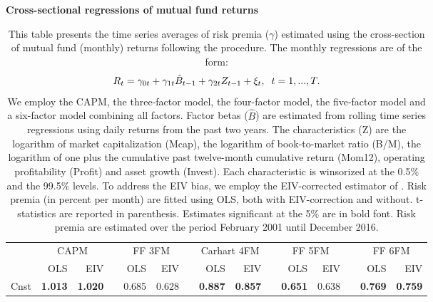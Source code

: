 \begin{singlespacing}
\begin{table}[h!]
\setlength{\tabcolsep}{4.5pt}
\centering
 {\captionsetup{justification=centering,singlelinecheck=off}
\caption{\bfseries Cross-sectional regressions of mutual fund returns }}
\caption*{This table presents the time series averages of risk premia ($\gamma$) estimated using the cross-section of mutual fund (monthly) returns following the \citet{fama1973risk} procedure. The monthly regressions are of the form: 
\begin{equation*}
R_{t} = \gamma_{0t} + \gamma_{1t}\hat{B}_{t-1} + \gamma_{2t}Z_{t-1} + \xi_{t}, \hspace{0.2cm} t=1,...,T.
\end{equation*} We employ the CAPM, the \citet{fama1993common} three-factor model, the \citet{carhart1997persistence} four-factor model, the \citet{FAMA20151} five-factor model and a six-factor model combining all factors. Factor betas ($\hat{B}$) are estimated from rolling time series regressions using daily returns from the past two years. The characteristics (Z) are the logarithm of market capitalization (Mcap), the logarithm of book-to-market ratio (B/M), the logarithm of one plus the cumulative past twelve-month cumulative return (Mom12), operating profitability (Profit) and asset growth (Invest). Each characteristic is winsorized at the 0.5\% and the 99.5\% levels. To address the EIV bias, we employ the EIV-corrected estimator of \citet{chordia2015cross}. Risk premia (in percent per month) are fitted using OLS, both with EIV-correction and without. \citet{fama1973risk} t-statistics are reported in parenthesis. Estimates significant at the 5\% are in bold font. Risk premia are estimated over the period February 2001 until December 2016.}
 \small
\label{my-label}
\begin{tabular}{lrrrrrrrrrrrrrr}
\hline
      & \multicolumn{2}{c}{CAPM}        &           & \multicolumn{2}{c}{FF 3FM}      &           & \multicolumn{2}{c}{Carhart 4FM}  &           & \multicolumn{2}{c}{FF 5FM}       &           & \multicolumn{2}{c}{FF 6FM}       \\ \cline{2-3} \cline{5-6} \cline{8-9} \cline{11-12} \cline{14-15} 
      & OLS            & EIV            &           & OLS            & EIV            &           & OLS            & EIV             &           & OLS            & EIV             &           & OLS            & EIV             \\ \hline
Cnst  & \textbf{1.013} & \textbf{1.020} &           & 0.685          & 0.628          &           & \textbf{0.887} & \textbf{0.857} &  & \textbf{0.651} & 0.638          &  & \textbf{0.769}  & \textbf{0.759} \\

\end{tabular}
\end{table}
\end{singlespacing}

